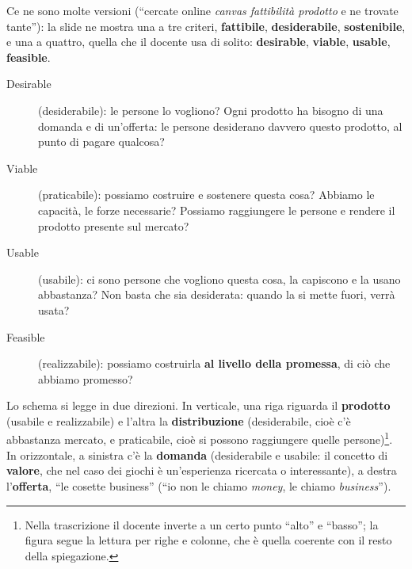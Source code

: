 Ce ne sono molte versioni (``cercate online \emph{canvas fattibilità prodotto} e ne
trovate tante''): la slide ne mostra una a tre criteri, \textbf{fattibile},
\textbf{desiderabile}, \textbf{sostenibile}, e una a quattro, quella che il docente usa di
solito: \textbf{desirable}, \textbf{viable}, \textbf{usable}, \textbf{feasible}.
\begin{description}
  \item[Desirable] (desiderabile): le persone lo vogliono? Ogni prodotto ha bisogno di una
        domanda e di un'offerta: le persone desiderano davvero questo prodotto, al punto
        di pagare qualcosa?
  \item[Viable] (praticabile): possiamo costruire e sostenere questa cosa? Abbiamo le
        capacità, le forze necessarie? Possiamo raggiungere le persone e rendere il
        prodotto presente sul mercato?
  \item[Usable] (usabile): ci sono persone che vogliono questa cosa, la capiscono e la
        usano abbastanza? Non basta che sia desiderata: quando la si mette fuori, verrà
        usata?
  \item[Feasible] (realizzabile): possiamo costruirla \textbf{al livello della
        promessa}, di ciò che abbiamo promesso?
\end{description}
Lo schema si legge in due direzioni. In verticale, una riga riguarda il
\textbf{prodotto} (usabile e realizzabile) e l'altra la \textbf{distribuzione}
(desiderabile, cioè c'è abbastanza mercato, e praticabile, cioè si possono raggiungere
quelle persone)\footnote{Nella trascrizione il docente inverte a un certo punto ``alto''
e ``basso''; la figura segue la lettura per righe e colonne, che è quella coerente con il
resto della spiegazione.}. In orizzontale, a sinistra c'è la \textbf{domanda}
(desiderabile e usabile: il concetto di \textbf{valore}, che nel caso dei giochi è
un'esperienza ricercata o interessante), a destra l'\textbf{offerta}, ``le cosette
business'' (``io non le chiamo \emph{money}, le chiamo \emph{business}'').


